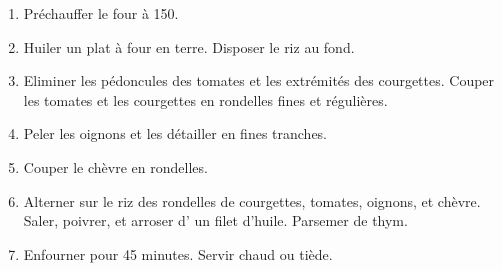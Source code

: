 
\begin{ingredients}
\end{ingredients}


\begin{recipe}
  \begin{enumerate}

  \item Pr\'echauffer le four \`a 150\degreeC.

  \item Huiler un plat \`a four en terre.  Disposer le riz au fond.

  \item Eliminer les p\'edoncules des tomates et les extr\'emit\'es
    des courgettes.  Couper  les tomates et les courgettes en
    rondelles fines et r\'eguli\`eres.

  \item Peler les oignons et les d\'etailler en fines tranches.

  \item Couper le ch\`evre en rondelles.

  \item Alterner sur le riz des rondelles de courgettes, tomates,
    oignons, et ch\`evre.  Saler, poivrer, et arroser d' un filet
    d'huile.  Parsemer de thym.

  \item Enfourner pour 45 minutes.  Servir chaud ou ti\`ede.

  \end{enumerate}
\end{recipe}
